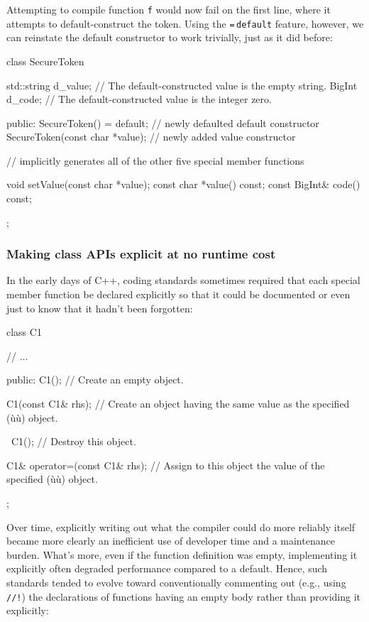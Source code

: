 \noindent Attempting to compile function \lstinline!f! would now fail on the
first line, where it attempts to default-construct the token. Using
the \lstinline!=!\,\lstinline!default! feature, however, we can reinstate the
default constructor to work trivially, just as
it did before:

\begin{emcppslisting}[emcppsbatch=e3]
class SecureToken
{
    std::string d_value;  // The default-constructed value is the empty string.
    BigInt d_code;        // The default-constructed value is the integer zero.

public:
    SecureToken() = default;         // newly defaulted default constructor
    SecureToken(const char *value);  // newly added value constructor

    // implicitly generates all of the other five special member functions

    void setValue(const char *value);
    const char *value() const;
    const BigInt& code() const;
};
\end{emcppslisting}


\subsubsection[Making class APIs explicit at no runtime cost]{Making class APIs explicit at no runtime cost}\label{making-class-apis-explicit-at-no-runtime-cost}

In the early days of C++, coding standards sometimes
required that each special member function be declared explicitly so
that it could be documented or even just to know that it hadn't been
forgotten:

\begin{emcppslisting}
class C1
{
     // ...

public:
   C1();
       // Create an empty object.

   C1(const C1& rhs);
       // Create an object having the same value as the specified (ù{}ù) object.

   ~C1();
       // Destroy this object.

   C1& operator=(const C1& rhs);
       // Assign to this object the value of the specified (ù{}ù) object.
};
\end{emcppslisting}

\noindent Over time, explicitly writing out what the compiler
could do more reliably itself became more clearly an inefficient use of developer time and a maintenance burden.
What's more, even if the function definition was empty, implementing it
explicitly often degraded performance compared to a  default. Hence, such
standards tended to evolve toward conventionally commenting out (e.g.,
using \lstinline|//!|)
the declarations of functions having an empty
body rather than providing it explicitly:

